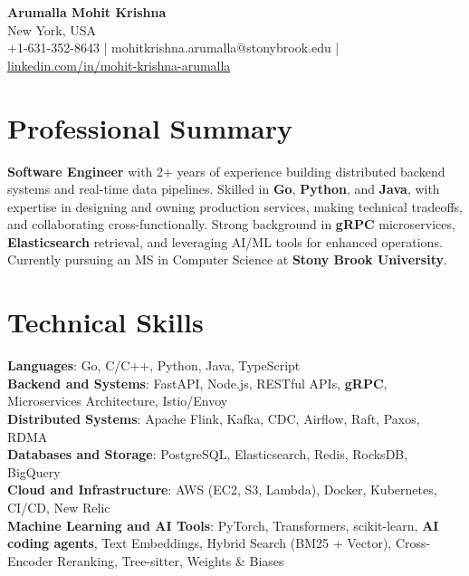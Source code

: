 \documentclass[letterpaper,11pt]{article}
\begin{document}
\begin{center}
  {\Large \textbf{Arumalla Mohit Krishna}} \\
  New York, USA \\
  +1-631-352-8643 \enspace | \enspace mohitkrishna.arumalla@stonybrook.edu \enspace | \enspace \href{https://www.linkedin.com/in/mohit-krishna-arumalla}{linkedin.com/in/mohit-krishna-arumalla}
\end{center}

\section{Professional Summary}
  \begin{itemize}[leftmargin=0.15in, label={}]
    \small{\item{
     \textbf{Software Engineer} with 2+ years of experience building distributed backend systems and real-time data pipelines. Skilled in \textbf{Go}, \textbf{Python}, and \textbf{Java}, with expertise in designing and owning production services, making technical tradeoffs, and collaborating cross-functionally. Strong background in \textbf{gRPC} microservices, \textbf{Elasticsearch} retrieval, and leveraging AI/ML tools for enhanced operations. Currently pursuing an MS in Computer Science at \textbf{Stony Brook University}.
    }}
  \end{itemize}
\vspace{-16pt}

\section{Technical Skills}
 \begin{itemize}[leftmargin=0.15in, label={}]
    \small{\item{
     \textbf{Languages}: Go, C/C++, Python, Java, TypeScript \\
     \textbf{Backend and Systems}: FastAPI, Node.js, RESTful APIs, \textbf{gRPC}, Microservices Architecture, Istio/Envoy \\
     \textbf{Distributed Systems}: Apache Flink, Kafka, CDC, Airflow, Raft, Paxos, RDMA \\
     \textbf{Databases and Storage}: PostgreSQL, Elasticsearch, Redis, RocksDB, BigQuery \\
     \textbf{Cloud and Infrastructure}: AWS (EC2, S3, Lambda), Docker, Kubernetes, CI/CD, New Relic \\
     \textbf{Machine Learning and AI Tools}: PyTorch, Transformers, scikit-learn, \textbf{AI coding agents}, Text Embeddings, Hybrid Search (BM25 + Vector), Cross-Encoder Reranking, Tree-sitter, Weights \& Biases
    }}
 \end{itemize}
\vspace{-16pt}
\end{document}
